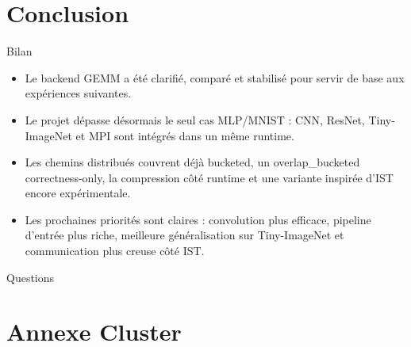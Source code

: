 \documentclass[aspectratio=169]{beamer}
\begin{document}
\section{Conclusion}

\begin{frame}{Bilan}
\small
\begin{itemize}
  \item Le backend GEMM a été clarifié, comparé et stabilisé pour servir de base aux expériences suivantes.
  \item Le projet dépasse désormais le seul cas MLP/MNIST : CNN, ResNet, Tiny-ImageNet et MPI sont intégrés dans un même runtime.
  \item Les chemins distribués couvrent déjà bucketed, un overlap\_bucketed correctness-only, la compression côté runtime et une variante inspirée d'IST encore expérimentale.
  \item Les prochaines priorités sont claires : convolution plus efficace, pipeline d'entrée plus riche, meilleure généralisation sur Tiny-ImageNet et communication plus creuse côté IST.
\end{itemize}

\vfill
\centering
\Large Questions
\end{frame}

\appendix
\section{Annexe Cluster}
\end{document}
